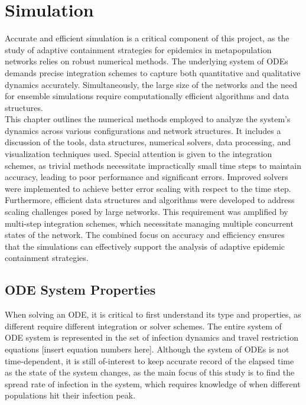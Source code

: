 
\section{Simulation}
Accurate and efficient simulation is a critical component of this project, as the study of adaptive containment strategies for epidemics in metapopulation networks relies on robust numerical methods. The underlying system of ODEs demands precise integration schemes to capture both quantitative and qualitative dynamics accurately. Simultaneously, the large size of the networks and the need for ensemble simulations require computationally efficient algorithms and data structures.\\

This chapter outlines the numerical methods employed to analyze the system's dynamics across various configurations and network structures. It includes a discussion of the tools, data structures, numerical solvers, data processing, and visualization techniques used. Special attention is given to the integration schemes, as trivial methods necessitate impractically small time steps to maintain accuracy, leading to poor performance and significant errors. Improved solvers were implemented to achieve better error scaling with respect to the time step.\\

Furthermore, efficient data structures and algorithms were developed to address scaling challenges posed by large networks. This requirement was amplified by multi-step integration schemes, which necessitate managing multiple concurrent states of the network. The combined focus on accuracy and efficiency ensures that the simulations can effectively support the analysis of adaptive epidemic containment strategies.\\

\subsection{ODE System Properties}
When solving an ODE, it is critical to first understand its type and properties, as different require different integration or solver schemes. The entire system of ODE system is represented in the set of infection dynamics and travel restriction equations [insert equation numbers here]. Although the system of ODEs is not time-dependent, it is still of-interest to keep accurate record of the elapsed time as the state of the system changes, as the main focus of this study is to find the spread rate of infection in the system, which requires knowledge of when different populations hit their infection peak. 
\\

